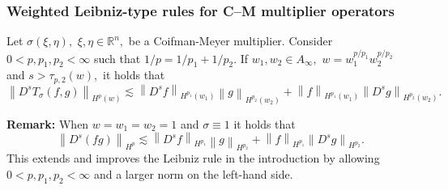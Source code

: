\documentclass[xcolor=dvipsnames]{beamer}
\newcommand{\rn}{{{\mathbb R}^n}}
\newcommand{\norm}[2]{{\left\| #1 \right\|}_{#2}}
\newcommand{\hcline}{1/p=1/p_1+1/p_2}
\begin{document}
\begin{frame}\frametitle{Weighted Leibniz-type rules for C--M multiplier operators}



\begin{corollary}[Naibo--T., 2018]\label{coro:KP:CM:Hardy}
Let $\sigma(\xi,\eta),$ $\xi,\eta\in\rn,$ be a Coifman-Meyer multiplier. 
Consider  $0 < p, p_1, p_2  < \infty$  such that $\hcline.$ If  $w_1,w_2\in A_\infty,$  $w=w_1^{{p}/{p_1}} w_2^{{p}/{p_2}}$ and   $s > \tau_{p,2}(w),$ it holds that
\begin{equation*}\label{KP:CM:Hardy}
\norm{D^sT_\sigma(f,g)}{H^p(w)} \lesssim \norm{D^s f}{H^{p_1}(w_1)} \norm{g}{H^{p_2}(w_2)} +  \norm{f}{H^{p_1}(w_1)}   \norm{D^s g}{H^{p_2}(w_2)}.
\end{equation*}
\end{corollary}

\medskip



\textbf{Remark:} When $w =w_1=w_2=1$ and $\sigma\equiv 1$ it holds that 
 \[ \norm{D^s(fg)}{H^p} \lesssim \norm{D^s f}{H^{p_1}} \norm{g}{H^{p_2}} +  \norm{f}{H^{p_1}}   \norm{D^s g}{H^{p_2}}.\]
 This extends and improves the Leibniz rule in the introduction by allowing $0<p,p_1,p_2<\infty$ and a larger norm on the left-hand side.

\end{frame}
\end{document}
